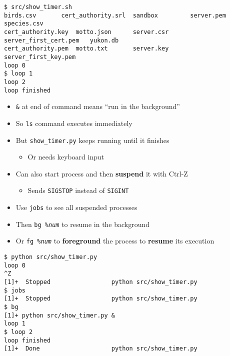 \documentclass[krantzl]{krantz}
\newcommand{\glossref}[1]{\textbf{#1}}
\begin{document}
\begin{lstlisting}[frame=tblr,backgroundcolor=\color{black!5}]
$ src/show_timer.sh
birds.csv       cert_authority.srl  sandbox         server.pem      species.csv
cert_authority.key  motto.json      server.csr      server_first_cert.pem   yukon.db
cert_authority.pem  motto.txt       server.key      server_first_key.pem
loop 0
$ loop 1
loop 2
loop finished
\end{lstlisting}

\begin{itemize}
\item \texttt{\&} at end of command means “run in the background”

\item So \texttt{ls} command executes immediately

\item But \texttt{show\_timer.py} keeps running until it finishes\begin{itemize}
\item Or needs keyboard input

\end{itemize}


\item Can also start process and then \glossref{suspend} it with Ctrl-Z\begin{itemize}
\item Sends \texttt{SIGSTOP} instead of \texttt{SIGINT}

\end{itemize}


\item Use \texttt{jobs} to see all suspended processes

\item Then \texttt{bg \%\emph{num}} to resume in the background

\item Or \texttt{fg \%\emph{num}} to \glossref{foreground} the process
    to \glossref{resume} its execution

\end{itemize}
\begin{lstlisting}[frame=tblr,backgroundcolor=\color{black!5}]
$ python src/show_timer.py
loop 0
^Z
[1]+  Stopped                 python src/show_timer.py
$ jobs
[1]+  Stopped                 python src/show_timer.py
$ bg
[1]+ python src/show_timer.py &
loop 1
$ loop 2
loop finished
[1]+  Done                    python src/show_timer.py
\end{lstlisting}
\end{document}
